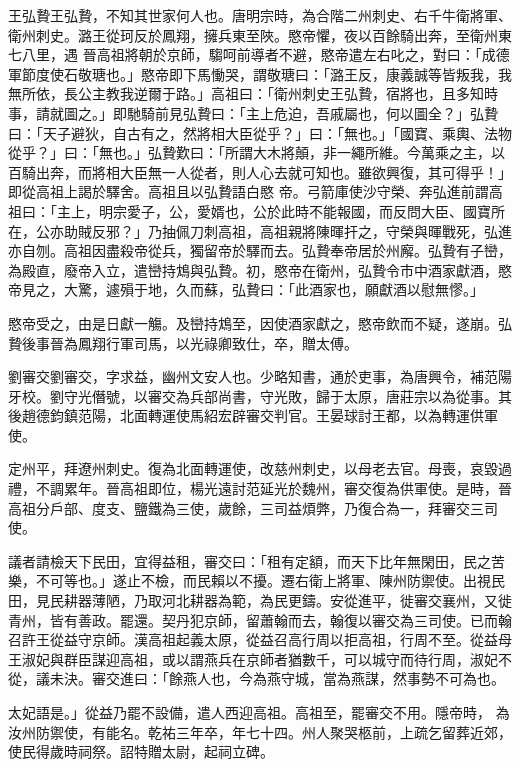 \begin{pinyinscope}
 王弘贄王弘贄，不知其世家何人也。唐明宗時，為合階二州刺史、右千牛衛將軍、衛州刺史。潞王從珂反於鳳翔，擁兵東至陜。愍帝懼，夜以百餘騎出奔，至衛州東七八里，遇
 晉高祖將朝於京師，騶呵前導者不避，愍帝遣左右叱之，對曰：「成德軍節度使石敬瑭也。」愍帝即下馬慟哭，謂敬瑭曰：「潞王反，康義誠等皆叛我，我無所依，長公主教我逆爾于路。」高祖曰：「衛州刺史王弘贄，宿將也，且多知時事，請就圖之。」即馳騎前見弘贄曰：「主上危迫，吾戚屬也，何以圖全？」弘贄曰：「天子避狄，自古有之，然將相大臣從乎？」曰：「無也。」「國寶、乘輿、法物從乎？」曰：「無也。」弘贄歎曰：「所謂大木將顛，非一繩所維。今萬乘之主，以百騎出奔，而將相大臣無一人從者，則人心去就可知也。雖欲興復，其可得乎！」即從高祖上謁於驛舍。高祖且以弘贄語白愍
 帝。弓箭庫使沙守榮、奔弘進前謂高祖曰：「主上，明宗愛子，公，愛婿也，公於此時不能報國，而反問大臣、國寶所在，公亦助賊反邪？」乃抽佩刀刺高祖，高祖親將陳暉扞之，守榮與暉戰死，弘進亦自刎。高祖因盡殺帝從兵，獨留帝於驛而去。弘贄奉帝居於州廨。弘贄有子巒，為殿直，廢帝入立，遣巒持鴆與弘贄。初，愍帝在衛州，弘贄令市中酒家獻酒，愍帝見之，大驚，遽殞于地，久而蘇，弘贄曰：「此酒家也，願獻酒以慰無憀。」



 愍帝受之，由是日獻一觴。及巒持鴆至，因使酒家獻之，愍帝飲而不疑，遂崩。弘贄後事晉為鳳翔行軍司馬，以光祿卿致仕，卒，贈太傅。



 劉審交劉審交，字求益，幽州文安人也。少略知書，通於吏事，為唐興令，補范陽牙校。劉守光僭號，以審交為兵部尚書，守光敗，歸于太原，唐莊宗以為從事。其後趙德鈞鎮范陽，北面轉運使馬紹宏辟審交判官。王晏球討王都，以為轉運供軍使。



 定州平，拜遼州刺史。復為北面轉運使，改慈州刺史，以母老去官。母喪，哀毀過禮，不調累年。晉高祖即位，楊光遠討范延光於魏州，審交復為供軍使。是時，晉高祖分戶部、度支、鹽鐵為三使，歲餘，三司益煩弊，乃復合為一，拜審交三司使。



 議者請檢天下民田，宜得益租，審交曰：「租有定額，而天下比年無閑田，民之苦
 樂，不可等也。」遂止不檢，而民賴以不擾。遷右衛上將軍、陳州防禦使。出視民田，見民耕器薄陋，乃取河北耕器為範，為民更鑄。安從進平，徙審交襄州，又徙青州，皆有善政。罷還。契丹犯京師，留蕭翰而去，翰復以審交為三司使。已而翰召許王從益守京師。漢高祖起義太原，從益召高行周以拒高祖，行周不至。從益母王淑妃與群臣謀迎高祖，或以謂燕兵在京師者猶數千，可以城守而待行周，淑妃不從，議未決。審交進曰：「餘燕人也，今為燕守城，當為燕謀，然事勢不可為也。



 太妃語是。」從益乃罷不設備，遣人西迎高祖。高祖至，罷審交不用。隱帝時，
 為汝州防禦使，有能名。乾祐三年卒，年七十四。州人聚哭柩前，上疏乞留葬近郊，使民得歲時祠祭。詔特贈太尉，起祠立碑。




\end{pinyinscope}
